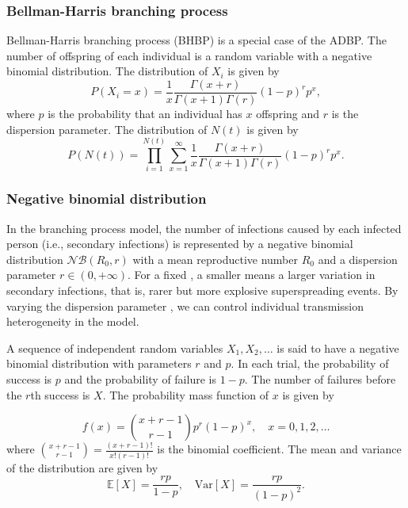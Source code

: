 \documentclass{article}
\begin{document}
\subsubsection*{Bellman-Harris branching process}
Bellman-Harris branching process (BHBP) is a special case of the ADBP. The number of offspring of each individual is a random variable with a negative binomial distribution. The distribution of $X_i$ is given by
\begin{equation}
P(X_i = x) = \frac{1}{x} \frac{\Gamma(x+r)}{\Gamma(x+1) \Gamma(r)} (1-p)^r p^x,
\end{equation}
where $p$ is the probability that an individual has $x$ offspring and $r$ is the dispersion parameter. The distribution of $N(t)$ is given by
\begin{equation}
P(N(t)) = \prod_{i=1}^{N(t)} \sum_{x=1}^{\infty} \frac{1}{x} \frac{\Gamma(x+r)}{\Gamma(x+1) \Gamma(r)} (1-p)^r p^x.
\end{equation}

\subsubsection*{Negative binomial distribution}

In the branching process model, the number of infections caused by each infected person (i.e., secondary infections) is represented by a negative binomial distribution $\mathcal{NB}(R_{0}, r)$ with a mean reproductive number $R_{0}$ and a dispersion parameter $r \in (0, +\infty)$. For a fixed , a smaller  means a larger variation in secondary infections, that is, rarer but more explosive superspreading events. By varying the dispersion parameter , we can control individual transmission heterogeneity in the model. 

A sequence of independent random variables $X_1, X_2, \ldots$ is said to have a negative binomial distribution with parameters $r$ and $p$. In each trial, the probability of success is $p$ and the probability of failure is $1-p$. The number of failures before the $r$th success is $X$. The probability mass function of $x$ is given by

\begin{equation}
    f(x) = \binom{x+r-1}{r-1} p^r (1-p)^x, \quad x = 0, 1, 2, \ldots
\end{equation}
where $\binom{x+r-1}{r-1} = \frac{(x+r-1)!}{x! (r-1)!}$ is the binomial coefficient. The mean and variance of the distribution are given by
\begin{equation}
    \mathbb{E}[X] = \frac{rp}{1-p}, \quad \text{Var}[X] = \frac{rp}{(1-p)^2}.
\end{equation}
\end{document}
